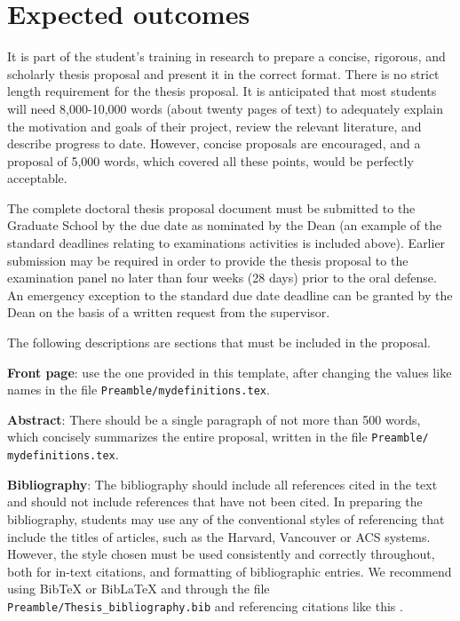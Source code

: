 
\chapter{Expected outcomes} \label{ch-6}

It is part of the student's training in research to prepare a concise, rigorous, and scholarly thesis proposal and present it in the correct format. There is no strict length requirement for the thesis proposal. It is anticipated that most students will need 8,000-10,000 words (about twenty pages of text) to adequately explain the motivation and goals of their project, review the relevant literature, and describe progress to date. However, concise proposals are encouraged, and a proposal of 5,000 words, which covered all these points, would be perfectly acceptable. 

The complete doctoral thesis proposal document must be submitted to the Graduate School by the due date as nominated by the Dean (an example of the standard deadlines relating to examinations activities is included above). Earlier submission may be required in order to provide the thesis proposal to the examination panel no later than four weeks (28 days) prior to the oral defense. An emergency exception to the standard due date deadline can be granted by the Dean on the basis of a written request from the supervisor.

The following descriptions are sections that must be included in the proposal.

\textbf{Front page}: use the one provided in this template, after changing the values like names in the file \texttt{Preamble/mydefinitions.tex}.

\textbf{Abstract}: There should be a single paragraph of not more than 500 words, which concisely summarizes the entire proposal, written in the file \texttt{Preamble/ mydefinitions.tex}.

\textbf{Bibliography}: The bibliography should include all references cited in the text and should not include references that have not been cited. In preparing the bibliography, students may use any of the conventional styles of referencing that include the titles of articles, such as the Harvard, Vancouver or ACS systems. However, the style chosen must be used consistently and correctly throughout, both for in-text citations, and formatting of bibliographic entries. We recommend using BibTeX or BibLaTeX and through the file \texttt{Preamble/Thesis\_bibliography.bib} and referencing citations like this \cite{Lee98, Muc10, Kra27}. 

